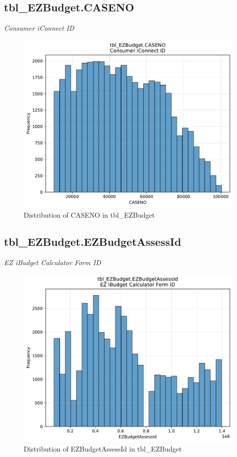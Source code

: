 \subsection{tbl\_EZBudget.CASENO}
\textit{Consumer iConnect ID}

\begin{figure}[htbp]
\centering
\includegraphics[width=\textwidth]{figures/dbo_tbl_EZBudget_CASENO.pdf}
\caption{Distribution of CASENO in tbl\_EZBudget}
\end{figure}\newpage

\subsection{tbl\_EZBudget.EZBudgetAssessId}
\textit{EZ iBudget Calculator Form ID}

\begin{figure}[htbp]
\centering
\includegraphics[width=\textwidth]{figures/dbo_tbl_EZBudget_EZBudgetAssessId.pdf}
\caption{Distribution of EZBudgetAssessId in tbl\_EZBudget}
\end{figure}\newpage

